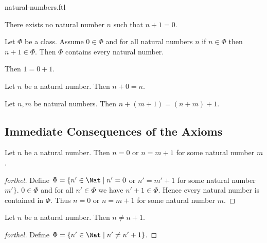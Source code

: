 \documentclass{naproche-library}
\begin{document}
\begin{smodule}{natural-numbers.ftl}
  \begin{axiom}[forthel,id=ARITHMETIC_01_4454289938317312,printid]
    There exists no natural number $n$ such that $n + 1 = 0$.
  \end{axiom}

  \begin{axiom}[forthel,title=Induction,id=ARITHMETIC_01_4764664342773760,printid]
    Let $\Phi$ be a class.
    Assume $0 \in \Phi$ and for all natural numbers $n$ if $n \in \Phi$ then
    $n + 1 \in \Phi$.
    Then $\Phi$ contains every natural number.
  \end{axiom}

  \begin{axiom}[forthel,id=ARITHMETIC_03_5962332515874540,printid]
    Then $1 = 0 + 1$.
  \end{axiom}

  \begin{axiom}[forthel,id=ARITHMETIC_03_4827955356237824,printid]
    Let $n$ be a natural number.
    Then $n + 0 = n$.
  \end{axiom}

  \begin{axiom}[forthel,id=ARITHMETIC_03_4427935386238924,printid]
    Let $n, m$ be natural numbers.
    Then $n + (m + 1) = (n + m) + 1$.
  \end{axiom}


  \subsection*{Immediate Consequences of the Axioms}

  \begin{proposition}[forthel,id=ARITHMETIC_01_4966080109871104,printid]
    Let $n$ be a natural number.
    Then $n = 0$ or $n = m + 1$ for some natural number $m$.
  \end{proposition}
  \begin{proof}[forthel]
    Define $\Phi = \{ n' \in \Nat \mid n' = 0$ or $n' = m' + 1$ for some natural number $m' \}$.
    $0 \in \Phi$ and for all $n' \in  \Phi$ we have $n' + 1 \in \Phi$.
    Hence every natural number is contained in $\Phi$.
    Thus $n = 0$ or $n = m + 1$ for some natural number $m$.
  \end{proof}

  \begin{proposition}[forthel,id=ARITHMETIC_01_5996049267163136,printid]
    Let $n$ be a natural number.
    Then $n \neq n + 1$.
  \end{proposition}
  \begin{proof}[forthel]
    Define $\Phi = \{ n' \in \Nat \mid n' \neq n' + 1 \}$.


\end{proof}
\end{smodule}
\end{document}
